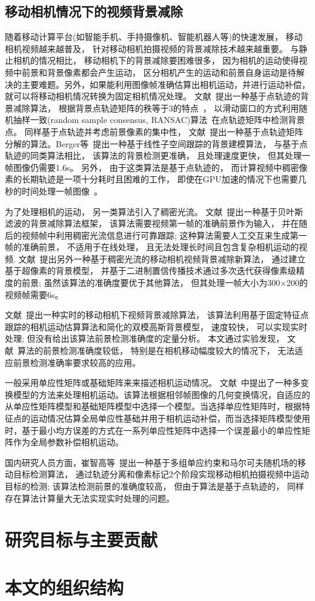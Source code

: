 \subsection{移动相机情况下的视频背景减除}
\label{sec:movingCamera}
随着移动计算平台(如智能手机、手持摄像机、智能机器人等)的快速发展， 移动相机视频越来越普及， 针对移动相机拍摄视频的背景减除技术越来越重要。 与静止相机的情况相比， 移动相机下的背景减除要困难很多， 因为相机的运动使得视频中前景和背景像素都会产生运动， 区分相机产生的运动和前景自身运动是待解决的主要难题。另外，如果能利用图像帧准确估算出相机运动，并进行运动补偿，就可以将移动相机情况转换为固定相机情况处理。
 文献~\cite{iccv2009}提出一种基于点轨迹的背景减除算法， 根据背景点轨迹矩阵的秩等于3的特点~\cite{Tomasi_1992}， 以滑动窗口的方式利用随机抽样一致(random sample consensus, RANSAC)算法~\cite{Ransac}在点轨迹矩阵中检测背景点。 同样基于点轨迹并考虑前景像素的集中性， 文献~\cite{Cui2012}提出一种基于点轨迹矩阵分解的算法。Berger等~\cite{SubspaceTracking}提出一种基于线性子空间跟踪的背景建模算法， 与基于点轨迹的同类算法相比， 该算法的背景检测更准确， 且处理速度更快， 但其处理一帧图像仍需要1.6s。 另外， 由于这类算法是基于点轨迹的， 而计算视频中稠密像素的长期轨迹是一项十分耗时且困难的工作， 即使在GPU加速的情况下也需要几秒的时间处理一帧图像~\cite{ECCV10DensePonintTrajectories}。\par

为了处理相机的运动， 另一类算法引入了稠密光流。 文献~\cite{kwak2011Generalized}提出一种基于贝叶斯滤波的背景减除算法框架， 该算法需要视频第一帧的准确前景作为输入， 并在随后的视频帧中利用稠密光流信息进行可靠跟踪; 这种算法需要人工交互来生成第一帧的准确前景， 不适用于在线处理， 且无法处理长时间且包含复杂相机运动的视频. 文献~\cite{gbsuperpixel}提出另外一种基于稠密光流的移动相机视频背景减除新算法， 通过建立基于超像素的背景模型， 并基于二进制置信传播技术通过多次迭代获得像素级精度的前景; 虽然该算法的准确度要优于其他算法， 但其处理一帧大小为300×200的视频帧需要6s。\par
文献~\cite{5.8s}提出一种实时的移动相机下视频背景减除算法， 该算法利用基于固定特征点跟踪的相机运动估算算法和简化的双模高斯背景模型， 速度较快， 可以实现实时处理; 但没有给出该算法前景检测准确度的定量分析。 本文通过实验发现， 文献~\cite{5.8s}算法的前景检测准确度较低， 特别是在相机移动幅度较大的情况下， 无法适应前景检测准确率要求较高的应用。\par
一般采用单应性矩阵或基础矩阵来来描述相机运动情况。 文献~中提出了一种多变换模型的方法来处理相机运动。该算法根据相邻帧图像的几何变换情况，自适应的从单应性矩阵模型和基础矩阵模型中选择一个模型。当选择单应性矩阵时，根据特征点的运动情况估算全局单应性基础并用于相机运动补偿，而当选择矩阵模型使用时，基于最小均方误差的方式在一系列单应性矩阵中选择一个误差最小的单应性矩阵作为全局参数补偿相机运动。\par
国内研究人员方面，崔智高等~\cite{czg}提出一种基于多组单应约束和马尔可夫随机场的移动目标检测算法， 通过轨迹分离和像素标记2个阶段实现移动相机拍摄视频中运动目标的检测; 该算法检测前景的准确度较高， 但由于算法是基于点轨迹的， 同样存在算法计算量大无法实现实时处理的问题。



\section{研究目标与主要贡献}
\label{sec:contents}


\section{本文的组织结构}
\label{sec:hierarchy} 